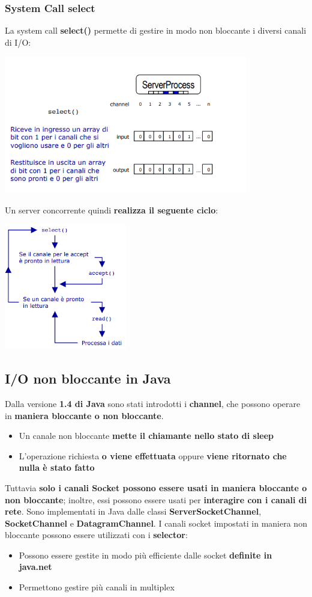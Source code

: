 \documentclass[12pt]{article}
\begin{document}
\subsubsection{System Call select}
La system call \textbf{select()} permette di gestire in modo non bloccante i diversi canali di I/O:
\begin{center}
    \includegraphics[width = 0.80\textwidth]{Images/39.PNG}
\end{center}
Un server concorrente quindi \textbf{realizza il seguente ciclo}:
\begin{center}
    \includegraphics[width = 0.40\textwidth]{Images/40.PNG}
\end{center}
\subsection{I/O non bloccante in Java}
Dalla versione \textbf{1.4 di Java} sono stati introdotti i \textbf{channel}, che possono operare in \textbf{maniera bloccante o non bloccante}.
\begin{itemize}
    \item Un canale non bloccante \textbf{mette il chiamante nello stato di sleep}
    \item L'operazione richiesta \textbf{o viene effettuata} oppure \textbf{viene ritornato che nulla è stato fatto}
\end{itemize}
Tuttavia \textbf{solo i canali Socket possono essere usati in maniera bloccante o non bloccante}; inoltre, essi possono essere usati per \textbf{interagire con i canali di rete}. Sono implementati in Java dalle classi \textbf{ServerSocketChannel}, \textbf{SocketChannel} e \textbf{DatagramChannel}. I canali socket impostati in maniera non bloccante possono essere utilizzati con i \textbf{selector}:
\begin{itemize}
    \item Possono essere gestite in modo più efficiente dalle socket \textbf{definite in java.net}
    \item Permettono gestire più canali in multiplex
\end{itemize}
\end{document}
